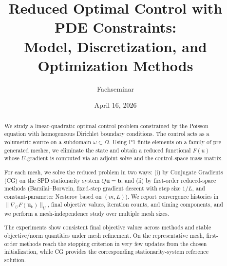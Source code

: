 \documentclass[11pt,a4paper]{article}
\title{Reduced Optimal Control with PDE Constraints:\\Model, Discretization, and Optimization Methods}
\author{Fachseminar}
\date{April 16, 2026}
\begin{document}
\maketitle
{}

\begin{abstract}
We study a linear-quadratic optimal control problem constrained by the Poisson equation with homogeneous Dirichlet boundary conditions. The control acts as a volumetric source on a subdomain $\omega\subset\Omega$. Using P1 finite elements on a family of pre-generated meshes, we eliminate the state and obtain a reduced functional $F(u)$ whose $U$-gradient is computed via an adjoint solve and the control-space mass matrix.

For each mesh, we solve the reduced problem in two ways: (i) by Conjugate Gradients (CG) on the SPD stationarity system $Q\mathbf u=\mathbf b$, and (ii) by first-order reduced-space methods (Barzilai--Borwein, fixed-step gradient descent with step size $1/L$, and constant-parameter Nesterov based on $(m,L)$). We report convergence histories in $\|\nabla_U F(\mathbf u_k)\|_U$, final objective values, iteration counts, and timing components, and we perform a mesh-independence study over multiple mesh sizes.

The experiments show consistent final objective values across methods and stable objective/norm quantities under mesh refinement. On the representative mesh, first-order methods reach the stopping criterion in very few updates from the chosen initialization, while CG provides the corresponding stationarity-system reference solution.
\end{abstract}
\end{document}
